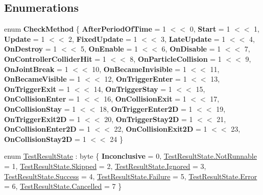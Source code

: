 \subsection*{Enumerations}
\begin{DoxyCompactItemize}
\item 
\mbox{\label{namespace_unity_test_a122951cc5d51a8001b93f000645c4443}} 
enum {\bfseries Check\+Method} \{ \newline
{\bfseries After\+Period\+Of\+Time} = 1 $<$$<$ 0, 
{\bfseries Start} = 1 $<$$<$ 1, 
{\bfseries Update} = 1 $<$$<$ 2, 
{\bfseries Fixed\+Update} = 1 $<$$<$ 3, 
\newline
{\bfseries Late\+Update} = 1 $<$$<$ 4, 
{\bfseries On\+Destroy} = 1 $<$$<$ 5, 
{\bfseries On\+Enable} = 1 $<$$<$ 6, 
{\bfseries On\+Disable} = 1 $<$$<$ 7, 
\newline
{\bfseries On\+Controller\+Collider\+Hit} = 1 $<$$<$ 8, 
{\bfseries On\+Particle\+Collision} = 1 $<$$<$ 9, 
{\bfseries On\+Joint\+Break} = 1 $<$$<$ 10, 
{\bfseries On\+Became\+Invisible} = 1 $<$$<$ 11, 
\newline
{\bfseries On\+Became\+Visible} = 1 $<$$<$ 12, 
{\bfseries On\+Trigger\+Enter} = 1 $<$$<$ 13, 
{\bfseries On\+Trigger\+Exit} = 1 $<$$<$ 14, 
{\bfseries On\+Trigger\+Stay} = 1 $<$$<$ 15, 
\newline
{\bfseries On\+Collision\+Enter} = 1 $<$$<$ 16, 
{\bfseries On\+Collision\+Exit} = 1 $<$$<$ 17, 
{\bfseries On\+Collision\+Stay} = 1 $<$$<$ 18, 
{\bfseries On\+Trigger\+Enter2D} = 1 $<$$<$ 19, 
\newline
{\bfseries On\+Trigger\+Exit2D} = 1 $<$$<$ 20, 
{\bfseries On\+Trigger\+Stay2D} = 1 $<$$<$ 21, 
{\bfseries On\+Collision\+Enter2D} = 1 $<$$<$ 22, 
{\bfseries On\+Collision\+Exit2D} = 1 $<$$<$ 23, 
\newline
{\bfseries On\+Collision\+Stay2D} = 1 $<$$<$ 24
 \}
\item 
enum \hyperlink{namespace_unity_test_ae932964473328b231e595f94d61ccc3b}{Test\+Result\+State} \+: byte \{ \newline
{\bfseries Inconclusive} = 0, 
\hyperlink{namespace_unity_test_ae932964473328b231e595f94d61ccc3ba32d0711b27a24a1b27416ccb4053b2b8}{Test\+Result\+State.\+Not\+Runnable} = 1, 
\hyperlink{namespace_unity_test_ae932964473328b231e595f94d61ccc3bad9c8f187972e6320a34e9c40b4cba605}{Test\+Result\+State.\+Skipped} = 2, 
\hyperlink{namespace_unity_test_ae932964473328b231e595f94d61ccc3bad96143ba1b15645919cea00ec9d1be62}{Test\+Result\+State.\+Ignored} = 3, 
\newline
\hyperlink{namespace_unity_test_ae932964473328b231e595f94d61ccc3ba505a83f220c02df2f85c3810cd9ceb38}{Test\+Result\+State.\+Success} = 4, 
\hyperlink{namespace_unity_test_ae932964473328b231e595f94d61ccc3bae139a585510a502bbf1841cf589f5086}{Test\+Result\+State.\+Failure} = 5, 
\hyperlink{namespace_unity_test_ae932964473328b231e595f94d61ccc3ba902b0d55fddef6f8d651fe1035b7d4bd}{Test\+Result\+State.\+Error} = 6, 
\hyperlink{namespace_unity_test_ae932964473328b231e595f94d61ccc3baa149e85a44aeec9140e92733d9ed694e}{Test\+Result\+State.\+Cancelled} = 7
 \}
\end{DoxyCompactItemize}


